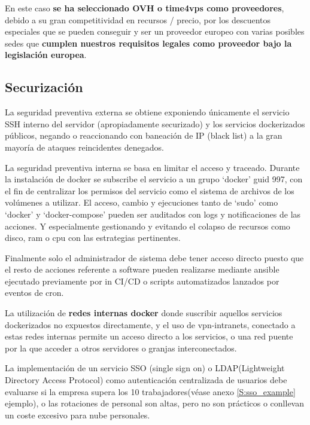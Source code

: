 En este caso \textbf{se ha seleccionado OVH\cite{c_vps_ovh} o time4vps\cite{c_vps_time4vps} como proveedores}, debido a su gran competitividad en recursos / precio, por los descuentos especiales que se pueden conseguir y ser un proveedor europeo con varias posibles sedes que \textbf{cumplen nuestros requisitos legales como proveedor bajo la legislación europea}\cite{c_ue_rpgd}.

\subsection{Securización}
La seguridad preventiva externa se obtiene exponiendo únicamente el servicio SSH interno del servidor (apropiadamente securizado) y los servicios dockerizados públicos, negando o reaccionando con baneación de IP (black list) a la gran mayoría de ataques reincidentes denegados.

La seguridad preventiva interna se basa en limitar el acceso y traceado. Durante la instalación de docker se subscribe el servicio a un grupo ‘docker’ guid 997, con el fin de centralizar los permisos del servicio como el sistema de archivos de los volúmenes a utilizar. El acceso, cambio y ejecuciones tanto de ‘sudo’ como ‘docker’ y ‘docker-compose’ pueden ser auditados con logs y notificaciones de las acciones. Y especialmente gestionando y evitando el colapso de recursos como disco, ram o cpu con las estrategias pertinentes.

Finalmente solo el administrador de sistema debe tener acceso directo puesto que el resto de acciones referente a software pueden realizarse mediante ansible ejecutado previamente por in CI/CD o scripts automatizados lanzados por eventos de cron.

La utilización de \textbf{redes internas docker}\cite{c_docker_network} donde suscribir aquellos servicios dockerizados no expuestos directamente, y el uso de vpn-intranets, conectado a estas redes internas permite un acceso directo a los servicios, o una red puente por la que acceder a otros servidores o granjas interconectados.

La implementación de un servicio SSO \cite{c_sso}(single sign on) o LDAP\cite{c_ldap}(Lightweight Directory Access Protocol) como autenticación centralizada de usuarios debe evaluarse si la empresa supera los 10 trabajadores(véase anexo \ref{S:sso_example} ejemplo), o las rotaciones de personal son altas, pero no son prácticos o conllevan un coste excesivo para nube personales.

